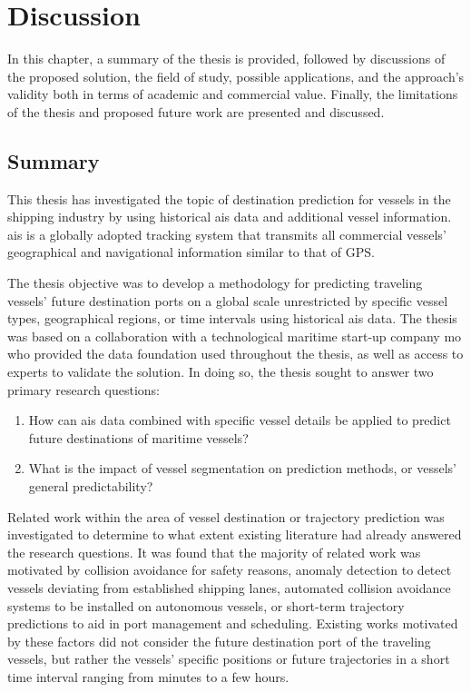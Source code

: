 \chapter{Discussion}
\label{chap:discussion}

In this chapter, a summary of the thesis is provided, followed by discussions of the proposed solution, the field of study, possible applications, and the approach's validity both in terms of academic and commercial value. Finally, the limitations of the thesis and proposed future work are presented and discussed.

\section{Summary}
\label{sec:summary}

This thesis has investigated the topic of destination prediction for vessels in the shipping industry by using historical \acrfull{ais} data and additional vessel information. \acrshort{ais} is a globally adopted tracking system that transmits all commercial vessels' geographical and navigational information similar to that of GPS\@.

The thesis objective was to develop a methodology for predicting traveling vessels' future destination ports on a global scale unrestricted by specific vessel types, geographical regions, or time intervals using historical \acrshort{ais} data. The thesis was based on a collaboration with a technological maritime start-up company \acrfull{mo} who provided the data foundation used throughout the thesis, as well as access to experts to validate the solution. In doing so, the thesis sought to answer two primary research questions:

\begin{enumerate}
    \item How can \acrshort{ais} data combined with specific vessel details be applied to predict future destinations of maritime vessels?
    \item What is the impact of vessel segmentation on prediction methods, or vessels' general predictability?
\end{enumerate}

Related work within the area of vessel destination or trajectory prediction was investigated to determine to what extent existing literature had already answered the research questions. It was found that the majority of related work was motivated by collision avoidance for safety reasons, anomaly detection to detect vessels deviating from established shipping lanes, automated collision avoidance systems to be installed on autonomous vessels, or short-term trajectory predictions to aid in port management and scheduling. Existing works motivated by these factors did not consider the future destination port of the traveling vessels, but rather the vessels' specific positions or future trajectories in a short time interval ranging from minutes to a few hours.

